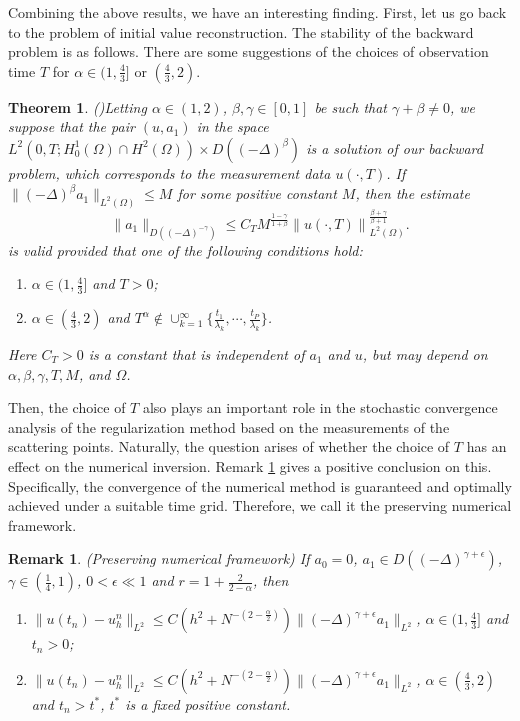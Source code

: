 \documentclass[11pt]{article}
\newtheorem{theorem}{Theorem}
\newtheorem{remark}{Remark}[section]
\numberwithin{equation}{section}
\begin{document}
Combining the above results, we have an interesting finding. First, let us go back to the problem of initial value reconstruction. The stability of the backward problem is as follows. There are some suggestions of the choices of observation time $T$ for $\alpha\in(1,\frac43]$ or $(\frac43,2)$.
\begin{theorem}(\cite{LiZhang2024})\label{th-sta-T}
Letting $\alpha\in(1,2)$, $\beta,\gamma\in [0,1]$ be such that $\gamma+\beta\neq0$, we suppose that the pair $(u,a_1)$ in the space $L^2 \left(0,T; H_0^1(\Omega) \cap H^2(\Omega) \right) \times D((-\Delta)^{\beta})$ is a solution of our backward problem, which corresponds to the measurement data $u(\cdot,T)$. If $\|(-\Delta)^{\beta} a_1\|_{L^2(\Omega)} \le M$ for some positive constant $M$, then the estimate
$$
\|a_1\|_{D((-\Delta)^{-\gamma})}\le  C_T M^{\frac{1-\gamma}{1+\beta}} \left\| u(\cdot, T)\right\|_{L^2(\Omega)}^{\frac{\beta+\gamma}{\beta+1}}.
$$
is valid provided that one of the following conditions hold: 
\begin{enumerate}[label = \roman*.]
    \item $\alpha\in(1,\frac43]$ and $T>0$;
    \item $\alpha\in(\frac43,2)$ and $T^\alpha \not\in \cup_{k=1}^\infty \{ \frac{t_1}{\lambda_k}, \cdots, \frac{t_P}{\lambda_k}\}$.
\end{enumerate}
Here $C_T>0$ is a constant that is independent of $a_1$ and $u$, but may depend on $\alpha,\beta,\gamma,T,M$, and $\Omega$.
\end{theorem}
Then, the choice of $T$ also plays an important role in the stochastic convergence analysis of the regularization method based on the measurements of the scattering points. Naturally, the question arises of whether the choice of $T$ has an effect on the numerical inversion. Remark \ref{Re-pre-numfram} gives a positive conclusion on this. Specifically, the convergence of the numerical method is guaranteed and optimally achieved under a suitable time grid. Therefore, we call it the preserving numerical framework. 
\begin{remark}\label{Re-pre-numfram}(Preserving numerical framework)
If $a_0=0$, $a_1\in D((-\Delta)^{\gamma+\epsilon})$, $\gamma\in(\frac{1}{4},1)$, $0<\epsilon\ll 1$ and $r=1+\frac{2}{2-\alpha}$, then 
\begin{enumerate}[label = \roman*.]
    \item $\|u(t_n)-u_h^n\|_{L^2}\leq C(h^2+N^{-(2-\frac{\alpha}{2})})\|(-\Delta)^{\gamma+\epsilon}a_1\|_{L^2}$, $\alpha\in(1,\frac43]$ and $t_n>0$;
    \item $\|u(t_n)-u_h^n\|_{L^2}\leq C(h^2+N^{-(2-\frac{\alpha}{2})})\|(-\Delta)^{\gamma+\epsilon}a_1\|_{L^2}$, $\alpha\in(\frac43,2)$ and $t_n>t^*$, $t^*$ is a fixed positive constant.
\end{enumerate}
\end{remark}
\end{document}

